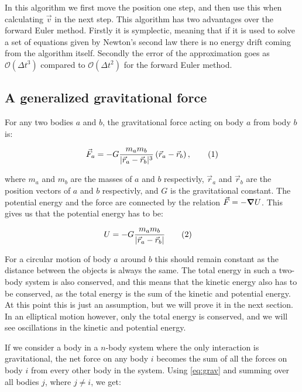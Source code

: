 \documentclass[reprint,english,notitlepage]{revtex4-1}  %
\newcommand\numberthis{\addtocounter{equation}{1}\tag{\theequation}}
\begin{document}
In this algorithm we first move the position one step, and then use this when calculating $\vec{v}$ in the next step. This algorithm has two advantages over the forward Euler method. Firstly it is symplectic, meaning that if it is used to solve a set of equations given by Newton's second law there is no energy drift coming from the algorithm itself. Secondly the error of the approximation goes as $\mathcal{O}(\Delta t^3)$ compared to $\mathcal{O}(\Delta t^2)$ for the forward Euler method.

\subsection{A generalized gravitational force} \label{sec:II:b}
For any two bodies \(a\) and \(b\), the gravitational force acting on body \(a\) from body \(b\) is:

\begin{align*}
	\vec{F}_{a} = -G\frac{m_{a}m_{b}}{|\vec{r}_{a}-\vec{r}_{b}|^{3}}\left(\vec{r}_{a}-\vec{r}_{b}\right), \numberthis \label{eq:grav} \\
\end{align*}

where \(m_{a}\) and \(m_{b}\) are the masses of \(a\) and \(b\) respectivly, \(\vec{r}_{a}\) and \(\vec{r}_{b}\) are the position vectors of \(a\) and \(b\) respectivly, and \(G\) is the gravitational constant. The potential energy and the force are connected by the relation $\vec{F} = - \gradient U$. This gives us that the potential energy has to be:

\begin{align*}
U &= - G \frac{m_a m_b}{|\vec{r}_a - \vec{r}_b|} \numberthis \label{eq:pot_en}
\end{align*}

For a circular motion of body $a$ around $b$ this should remain constant as the distance between the objects is always the same. The total energy in such a two-body system is also conserved, and this means that the kinetic energy also has to be conserved, as the total energy is the sum of the kinetic and potential energy. At this point this is just an assumption, but we will prove it in the next section. In an elliptical motion however, only the total energy is conserved, and we will see oscillations in the kinetic and potential energy.

If we consider a body in a \(n\)-body system where the only interaction is gravitational, the net force on any body \(i\) becomes the sum of all the forces on body \(i\) from every other body in the system. Using \eqref{eq:grav} and summing over all bodies \(j\), where \(j\neq i\), we get:
\end{document}
